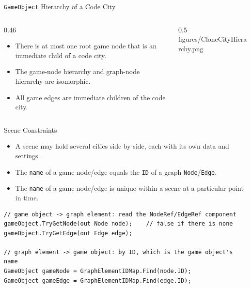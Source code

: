 \begin{frame}{\texttt{GameObject} Hierarchy of a Code City}
  \begin{columns}[c]
    \begin{column}{0.46\textwidth}
      \begin{itemize}
        \item There is at most one root game node that is an immediate child
        of a code city.
        \item The game-node hierarchy and graph-node hierarchy
        are isomorphic.
        \item All game edges are immediate children of the code city.
      \end{itemize}
    \end{column}
    \begin{column}{0.5\textwidth}
                  {figures/CloneCityHierarchy.png}
    \end{column}
  \end{columns}
\end{frame}

\begin{frame}[fragile]{Scene Constraints}
    \begin{itemize}
        \item  A scene may hold several cities side by side,
        each with its own data and settings.
        \item The \texttt{name} of a game node/edge equals the \texttt{ID}
        of a graph \texttt{Node}/\texttt{Edge}.
        \item The \texttt{name} of a game node/edge is unique within
        a scene at a particular point in time.
    \end{itemize}
    \vspace{1ex}

    \begin{lstlisting}[basicstyle=\scriptsize\ttfamily]
// game object -> graph element: read the NodeRef/EdgeRef component
gameObject.TryGetNode(out Node node);    // false if there is none
gameObject.TryGetEdge(out Edge edge);

// graph element -> game object: by ID, which is the game object's name
GameObject gameNode = GraphElementIDMap.Find(node.ID);
GameObject gameEdge = GraphElementIDMap.Find(edge.ID);
    \end{lstlisting}
    \vspace{1ex}

\end{frame}


